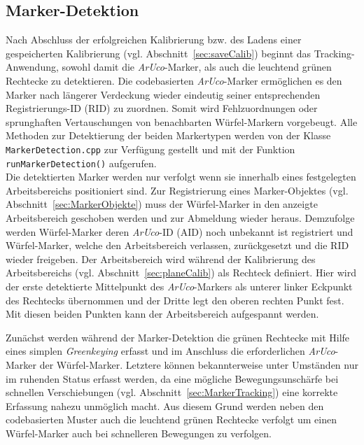 \subsection{Marker-Detektion}\label{sec:MarkerDetektion}%
Nach Abschluss der erfolgreichen Kalibrierung bzw. des Ladens einer gespeicherten Kalibrierung (vgl. Abschnitt~\ref{sec:saveCalib}) beginnt das Tracking-Anwendung, sowohl damit die \textit{ArUco}-Marker, als auch die leuchtend grünen Rechtecke zu detektieren. Die codebasierten \textit{ArUco}-Marker ermöglichen es den Marker nach längerer Verdeckung wieder eindeutig seiner entsprechenden Registrierungs-ID (RID) zu zuordnen. Somit wird Fehlzuordnungen oder sprunghaften Vertauschungen von benachbarten Würfel-Markern vorgebeugt. Alle Methoden zur Detektierung der beiden Markertypen werden von der Klasse \texttt{Marker\-Detection.cpp} zur Verfügung gestellt und mit der Funktion \texttt{run\-Marker\-Detection()} aufgerufen. \\
Die detektierten Marker werden nur verfolgt wenn sie innerhalb eines festgelegten Arbeitsbereichs positioniert sind. Zur Registrierung eines Marker-Objektes (vgl. Abschnitt~\ref{sec:MarkerObjekte}) muss der Würfel-Marker in den anzeigte Arbeitsbereich geschoben werden und zur Abmeldung wieder heraus. Demzufolge werden Würfel-Marker deren \textit{ArUco}-ID (AID) noch unbekannt ist registriert und Würfel-Marker, welche den Arbeitsbereich verlassen, zurückgesetzt und die RID wieder freigeben. Der Arbeitsbereich wird während der Kalibrierung des Arbeitsbereichs (vgl. Abschnitt~\ref{sec:planeCalib}) als Rechteck definiert. Hier wird der erste detektierte Mittelpunkt des \textit{ArUco}-Markers als unterer linker Eckpunkt des Rechtecks übernommen und der Dritte legt den oberen rechten Punkt fest. Mit diesen beiden Punkten kann der Arbeitsbereich aufgespannt werden. 

Zunächst werden während der Marker-Detektion die grünen Rechtecke mit Hilfe eines simplen \textit{Greenkeying} erfasst und im Anschluss die erforderlichen \textit{ArUco}-Marker der Würfel-Marker. Letztere können bekannterweise unter Umständen nur im ruhenden Status erfasst werden, da eine mögliche Bewegungsunschärfe bei schnellen Verschiebungen (vgl. Abschnitt~\ref{sec:MarkerTracking}) eine korrekte Erfassung nahezu unmöglich macht. 
Aus diesem Grund werden neben den codebasierten Muster auch die leuchtend grünen Rechtecke verfolgt um einen Würfel-Marker auch bei schnelleren Bewegungen zu verfolgen.

